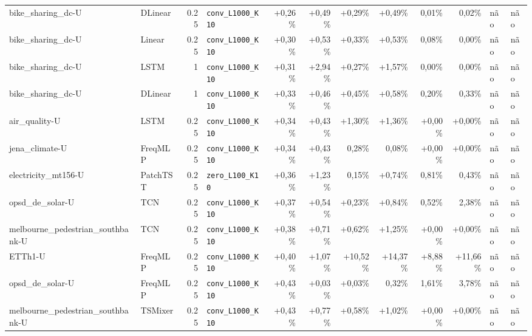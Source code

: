 \begin{longtable}{llrlrrrrrrll}
bike\_sharing\_dc-U & DLinear & 0.25 & \texttt{conv\_\allowbreak{}L1000\_\allowbreak{}K10} & +0,26\% & +0,49\% & +0,29\% & +0,49\% & \textminus{}0,01\% & \textminus{}0,02\% & n\~ao & n\~ao \\
bike\_sharing\_dc-U & Linear & 0.25 & \texttt{conv\_\allowbreak{}L1000\_\allowbreak{}K10} & +0,30\% & +0,53\% & +0,33\% & +0,53\% & \textminus{}0,08\% & \textminus{}0,00\% & n\~ao & n\~ao \\
bike\_sharing\_dc-U & LSTM & 1 & \texttt{conv\_\allowbreak{}L1000\_\allowbreak{}K10} & +0,31\% & +2,94\% & +0,27\% & +1,57\% & \textminus{}0,00\% & \textminus{}0,00\% & n\~ao & n\~ao \\
bike\_sharing\_dc-U & DLinear & 1 & \texttt{conv\_\allowbreak{}L1000\_\allowbreak{}K10} & +0,33\% & +0,46\% & +0,45\% & +0,58\% & \textminus{}0,20\% & \textminus{}0,33\% & n\~ao & n\~ao \\
air\_quality-U & LSTM & 0.25 & \texttt{conv\_\allowbreak{}L1000\_\allowbreak{}K10} & +0,34\% & +0,43\% & +1,30\% & +1,36\% & +0,00\% & +0,00\% & n\~ao & n\~ao \\
jena\_climate-U & FreqMLP & 0.25 & \texttt{conv\_\allowbreak{}L1000\_\allowbreak{}K10} & +0,34\% & +0,43\% & \textminus{}0,28\% & \textminus{}0,08\% & +0,00\% & +0,00\% & n\~ao & n\~ao \\
electricity\_mt156-U & PatchTST & 0.25 & \texttt{zero\_\allowbreak{}L100\_\allowbreak{}K10} & +0,36\% & +1,23\% & \textminus{}0,15\% & +0,74\% & \textminus{}0,81\% & \textminus{}0,43\% & n\~ao & n\~ao \\
opsd\_de\_solar-U & TCN & 0.25 & \texttt{conv\_\allowbreak{}L1000\_\allowbreak{}K10} & +0,37\% & +0,54\% & +0,23\% & +0,84\% & \textminus{}0,52\% & \textminus{}2,38\% & n\~ao & n\~ao \\
melbourne\_pedestrian\_southbank-U & TCN & 0.25 & \texttt{conv\_\allowbreak{}L1000\_\allowbreak{}K10} & +0,38\% & +0,71\% & +0,62\% & +1,25\% & +0,00\% & +0,00\% & n\~ao & n\~ao \\
ETTh1-U & FreqMLP & 0.25 & \texttt{conv\_\allowbreak{}L1000\_\allowbreak{}K10} & +0,40\% & +1,07\% & +10,52\% & +14,37\% & +8,88\% & +11,66\% & n\~ao & n\~ao \\
opsd\_de\_solar-U & FreqMLP & 0.25 & \texttt{conv\_\allowbreak{}L1000\_\allowbreak{}K10} & +0,43\% & +0,03\% & +0,03\% & \textminus{}0,32\% & \textminus{}1,61\% & \textminus{}3,78\% & n\~ao & n\~ao \\
melbourne\_pedestrian\_southbank-U & TSMixer & 0.25 & \texttt{conv\_\allowbreak{}L1000\_\allowbreak{}K10} & +0,43\% & +0,77\% & +0,58\% & +1,02\% & +0,00\% & +0,00\% & n\~ao & n\~ao \\

\end{longtable}
